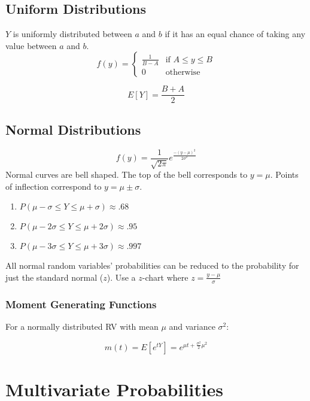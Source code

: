 \documentclass{article}
\begin{document}
\subsection{Uniform Distributions}
$Y$ is uniformly distributed between $a$ and $b$ if it has an equal chance of
taking any value between $a$ and $b$.
\begin{equation}
  f(y) =
    \begin{cases}
      \frac{1}{B-A}  & \text{if } A \leq y \leq B \\
      0  & \text{otherwise}
    \end{cases}
\end{equation}

\begin{equation}
  E[Y]=\frac{B+A}{2}
\end{equation}
\subsection{Normal Distributions}
\begin{equation}
  f(y) = \frac{1}{\sqrt{2\pi}} e^{\frac{-(y-\mu)^2}{2\sigma^2}}
\end{equation}
Normal curves are bell shaped. The top of the bell corresponds to $y=\mu$.
Points of inflection correspond to $y=\mu \pm \sigma$.

\begin{enumerate}
  \item $P(\mu - \sigma \leq Y \leq \mu + \sigma) \approx .68$
  \item $P(\mu - 2\sigma \leq Y \leq \mu + 2\sigma) \approx .95$
  \item $P(\mu - 3\sigma \leq Y \leq \mu + 3\sigma) \approx .997$
\end{enumerate}

All normal random variables' probabilities can be reduced to the probability
for just the standard normal ($z$). Use a $z$-chart where
$z=\frac{y-\mu}{\sigma}$

\subsubsection{Moment Generating Functions}
For a normally distributed RV with mean $\mu$ and variance $\sigma^2$:

\begin{equation}
  m(t) = E[e^{tY}] = e^{\mu t + \frac{\sigma^2}{2}\mu^2}
\end{equation}

\section{Multivariate Probabilities}
\end{document}
